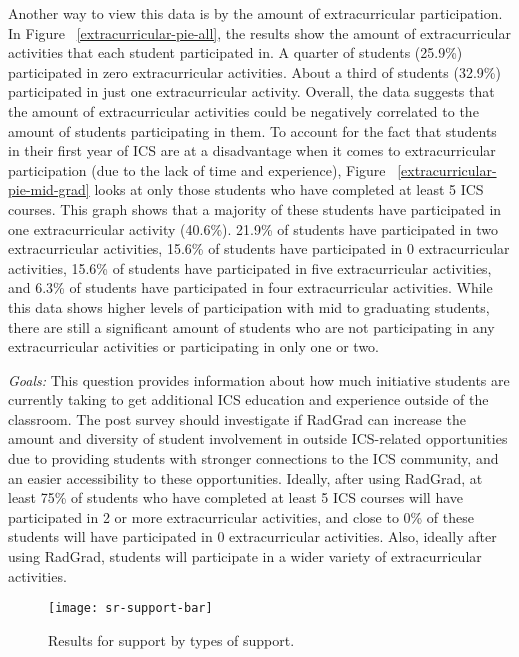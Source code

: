 \begin{enumerate}
Another way to view this data is by the amount of extracurricular participation. In Figure ~\ref{extracurricular-pie-all}, the results show the amount of extracurricular activities that each student participated in. A quarter of students (25.9\%) participated in zero extracurricular activities. About a third of students (32.9\%) participated in just one extracurricular activity. Overall, the data suggests that the amount of extracurricular activities could be negatively correlated to the amount of students participating in them. 
To account for the fact that students in their first year of ICS are at a disadvantage when it comes to extracurricular participation (due to the lack of time and experience), Figure ~\ref{extracurricular-pie-mid-grad} looks at only those students who have completed at least 5 ICS courses. This graph shows that a majority of these students have participated in one extracurricular activity (40.6\%). 21.9\% of students have participated in two extracurricular activities, 15.6\% of students have participated in 0 extracurricular activities, 15.6\% of students have participated in five extracurricular activities, and 6.3\% of students have participated in four extracurricular activities. While this data shows higher levels of participation with mid to graduating students, there are still a significant amount of students who are not participating in any extracurricular activities or participating in only one or two. 

\textit{Goals:} This question provides information about how much initiative students are currently taking to get additional ICS education and experience outside of the classroom. The post survey should investigate if RadGrad can increase the amount and diversity of student involvement in outside ICS-related opportunities due to providing students with stronger connections to the ICS community, and an easier accessibility to these opportunities. Ideally, after using RadGrad, at least 75\% of students who have completed at least 5 ICS courses will have participated in 2 or more extracurricular activities, and close to 0\% of these students will have participated in 0 extracurricular activities. Also, ideally after using RadGrad, students will participate in a wider variety of extracurricular activities.

\begin{figure}[h]
\centering
\texttt{[image: sr-support-bar]}
\caption{Results for support by types of support.}
\label{support-bar}
\end{figure}


\end{enumerate}
